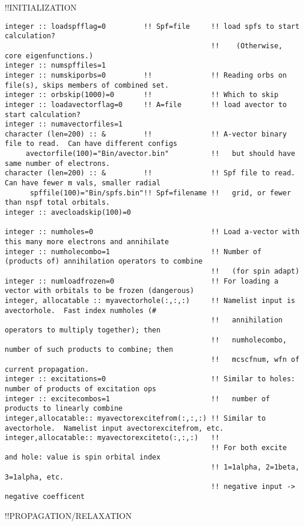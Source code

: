 !!{\large \quad INITIALIZATION}
\begin{verbatim}
integer :: loadspfflag=0         !! Spf=file     !! load spfs to start calculation?  
                                                 !!    (Otherwise, core eigenfunctions.)
integer :: numspffiles=1
integer :: numskiporbs=0         !!              !! Reading orbs on file(s), skips members of combined set.
integer :: orbskip(1000)=0       !!              !! Which to skip
integer :: loadavectorflag=0     !! A=file       !! load avector to start calculation?
integer :: numavectorfiles=1
character (len=200) :: &         !!              !! A-vector binary file to read.  Can have different configs
     avectorfile(100)="Bin/avector.bin"          !!   but should have same number of electrons.   
character (len=200) :: &         !!              !! Spf file to read.  Can have fewer m vals, smaller radial 
      spffile(100)="Bin/spfs.bin"!! Spf=filename !!   grid, or fewer than nspf total orbitals. 
integer :: avecloadskip(100)=0

integer :: numholes=0                            !! Load a-vector with this many more electrons and annihilate
integer :: numholecombo=1                        !! Number of (products of) annihilation operators to combine 
                                                 !!   (for spin adapt)
integer :: numloadfrozen=0                       !! For loading a vector with orbitals to be frozen (dangerous)
integer, allocatable :: myavectorhole(:,:,:)     !! Namelist input is avectorhole.  Fast index numholes (#
                                                 !!   annihilation operators to multiply together); then    
                                                 !!   numholecombo, number of such products to combine; then
                                                 !!   mcscfnum, wfn of current propagation.
integer :: excitations=0                         !! Similar to holes: number of products of excitation ops
integer :: excitecombos=1                        !!   number of products to linearly combine
integer,allocatable:: myavectorexcitefrom(:,:,:) !! Similar to avectorhole.  Namelist input avectorexcitefrom, etc.
integer,allocatable:: myavectorexciteto(:,:,:)   !!
                                                 !! For both excite and hole: value is spin orbital index
                                                 !! 1=1alpha, 2=1beta, 3=1alpha, etc.
                                                 !! negative input -> negative coefficent
\end{verbatim}
!!{\large \quad PROPAGATION/RELAXATION}
